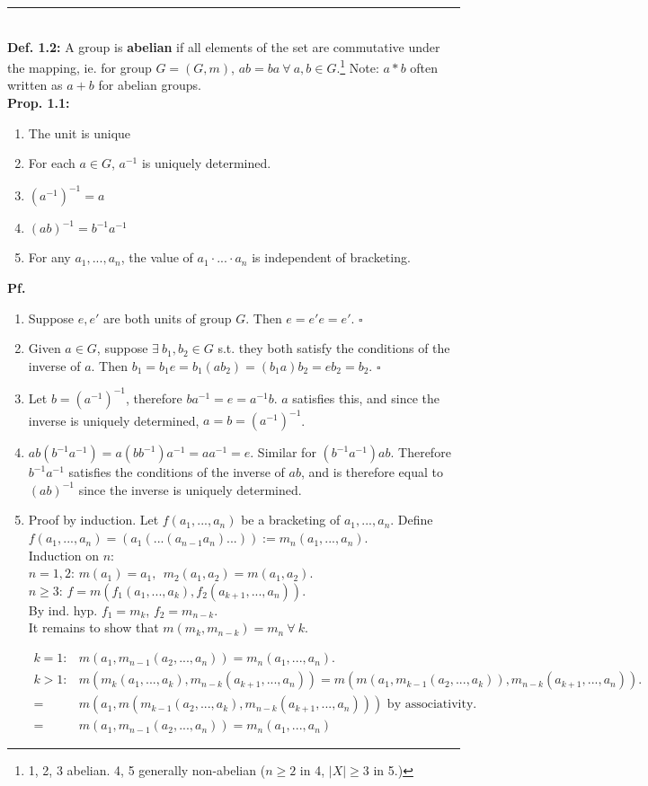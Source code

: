 \documentclass{article}
\begin{document}
\hrule
\vspace{3mm}~\\
\textbf{Def. 1.2:} A group is \textbf{abelian} if all elements of the set are commutative under the mapping, ie. for group $G=(G,m)$, $ab=ba~\forall~a,b\in G$.\footnote{1, 2, 3 abelian. 4, 5 generally non-abelian ($n\geq 2$ in 4, $|X| \geq 3$ in 5.)} Note: $a*b$ often written as $a+b$ for abelian groups.\\
\textbf{Prop. 1.1:} 
\begin{enumerate}
\item The unit is unique
\item For each $a\in G$, $a^{-1}$ is uniquely determined.
\item $(a^{-1})^{-1}=a$
\item $(ab)^{-1}=b^{-1}a^{-1}$
\item For any $a_1, ..., a_n$, the value of $a_1\cdot ... \cdot a_n$ is independent of bracketing.
\end{enumerate}
\textbf{Pf.}
\begin{enumerate}
\item Suppose $e, e\prime$ are both units of group $G$. Then $e=e' e = e'$. $\square$
\item Given $a \in G$, suppose $\exists~ b_1,b_2 \in G$ s.t. they both satisfy the conditions of the inverse of $a$. Then $b_1=b_1 e = b_1(ab_2)=(b_1a)b_2=eb_2=b_2$. $\square$
\item Let $b=(a^{-1})^{-1}$, therefore $ba^{-1}=e=a^{-1} b$. $a$ satisfies this, and since the inverse is uniquely determined, $a=b=(a^{-1})^{-1}$.
\item $ ab(b^{-1}a^{-1})=a(bb^{-1})a^{-1}=aa^{-1}=e$. Similar for $(b^{-1}a^{-1})ab$. Therefore $b^{-1}a^{-1} $ satisfies the conditions of the inverse of $ab$, and is therefore equal to $(ab)^{-1}$ since the inverse is uniquely determined. 
\item Proof by induction. Let $f(a_1,...,a_n)$ be a bracketing of $a_1,...,a_n$. Define $f(a_1,...,a_n)=(a_1(...(a_{n-1}a_n)...)):=m_n(a_1,...,a_n)$.
\vspace{2mm}\\
Induction on $n$:\\ $n=1,2$: $m(a_1)=a_1,~~m_2(a_1,a_2)=m(a_1,a_2)$.\\$n\geq 3$: $f=m(f_1(a_1,...,a_k),f_2(a_{k+1},...,a_n))$.\\
By ind. hyp. $f_1=m_k$, $f_2=m_{n-k}$.\\
It remains to show that $m(m_k,m_{n-k})=m_n~\forall~ k$.

\begin{align*}
k=1:& m(a_1,m_{n-1}(a_2,...,a_n))=m_n(a_1,...,a_n).\\
k > 1:& m(m_k(a_1,...,a_k),m_{n-k}(a_{k+1},...,a_n))=m(m(a_1,m_{k-1}(a_2,...,a_k)),m_{n-k}(a_{k+1},...,a_n)).\\ =&m(a_1,m(m_{k-1}(a_2,...,a_k),m_{n-k}(a_{k+1},...,a_n))) \text{ by associativity.}\\
=&m(a_1,m_{n-1}(a_2,...,a_n))=m_n(a_1,...,a_n)
\end{align*}
\end{enumerate}
\end{document}
